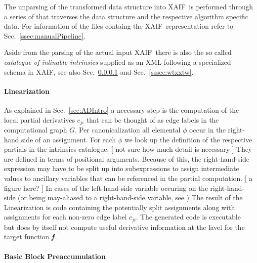 \documentclass[11pt]{article}
\newcommand{\xaif}{XAIF}
\newcommand{\bmf}{\mbox{\bf\em f}}
\newcommand{\refsec}[1]{{Sec.~\ref{#1}}}
\begin{document}
The unparsing of the transformed data structure into \xaif\ is performed 
through a series of that traverses the data structure and the 
respective algorithm specific data. 
For information of the files containg the \xaif\ representation refer to 
\refsec{ssec:manualPipeline}.

Aside from the parsing of the actual input \xaif\ there is also the so called 
{\em 
catalogue of inlinable intrinsics
} 
supplied as an XML following a specialized schema in \xaif, see also 
\refsec{sssec:linearization} and \refsec{sssec:wtxxtw}.


\paragraph{Linearization}\label{sssec:linearization}

As explained in \refsec{sec:ADIntro} a necessary step is the computation of 
the local partial derivatives $c_{ji}$ that can be thought of as edge labels 
in the computational graph $G$. Per canonicalization all elemental $\phi$ 
occur in the right-hand side of an assignment. 
For each $\phi$ we look up the definition of the respective partials in 
the intrinsics catalogue. 
{\color{red} [ not sure  how much detail is necessary ] } 
They are defined in terms of positional arguments. Because of this, 
the right-hand-side expression may have to be split up into 
subexpressions to assign intermediate values to ancillary variables 
that can be referenced in the partial computation.  
{\color{red} [ a figure here? ] }
In cases of the left-hand-side variable occuring on the right-hand-side (or being 
may-aliased to a right-hand-side variable, see )
The result of the Linearization is code containing the potentially split 
assignments along with assignments for each non-zero edge label $c_{ji}$.
The generated code is executable but does by itself not compute useful 
derivative information at the lavel for the target function $\bmf$.

\paragraph{Basic Block Preaccumulation}\label{sssec:BBPreacc}
\end{document}
